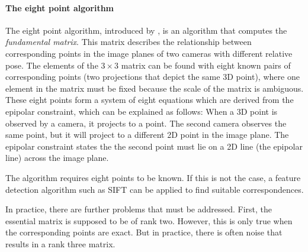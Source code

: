 		\paragraph{The eight point algorithm}
			The eight point algorithm, introduced by \cite{longuet1981}, is an algorithm that computes the \emph{fundamental matrix}.
			This matrix describes the relationship between corresponding points in the image planes of two cameras with different relative pose.
			The elements of the $3 \times 3$ matrix can be found with eight known pairs of corresponding points (two projections that depict the same 3D point), where one element in the matrix must be fixed because the scale of the matrix is ambiguous.
			These eight points form a system of eight equations which are derived from the epipolar constraint, which can be explained as follows:
			When a 3D point is observed by a camera, it projects to a point. 
			The second camera observes the same point, but it will project to a different 2D point in the image plane.
			The epipolar constraint states the the second point must lie on a 2D line (the epipolar line) across the image plane.
			
			The algorithm requires eight points to be known.
			If this is not the case, a feature detection algorithm such as {SIFT} can be applied to find suitable correspondences.
			
			In practice, there are further problems that must be addressed. 
			First, the essential matrix is supposed to be of rank two. 
			However, this is only true when the corresponding points are exact.
			But in practice, there is often noise that results in a rank three matrix.
			
		
